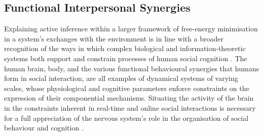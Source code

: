 \begin{CJK}{UTF8}{gbsn}
\subsection{Functional Interpersonal Synergies}
Explaining active inference within a larger framework of free-energy minimisation in a system's exchanges with the environment is in line with a broader recognition of the ways in which complex biological and information-theoretic systems both support and constrain processes of human social cognition \citep{Dale2014}.  The human brain, body, and the various functional behavioural synergies that humans form in social interaction, are all examples of dynamical systems of varying scales, whose physiological and cognitive parameters enforce constraints on the expression of their componential mechanisms.  Situating the activity of the brain in the constraints inherent in real-time and online social interactions is necessary for a full appreciation of the nervous system's role in the organisation of social behaviour and cognition \citep{Coey2012}.


\end{CJK}
